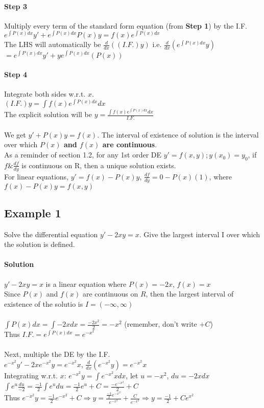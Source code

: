 \documentclass{article}
\begin{document}
\paragraph{Step 3} Multiply every term of the standard form equation (from \textbf{Step 1}) by the I.F.
\large \\$e^{\int\!P(x)dx}y'+e^{\int\!P(x)dx}P(x)y=f(x)e^{\int\!P(x)dx}$
\normalsize
\\The LHS will automatically be $\frac{d}{dx}((I.F.)y)$ i.e. $\frac{d}{dx}\left(e^{\int\!P(x)dx}y\right)$
\\$=e^{\int\!P(x)dx}y'+ye^{\int\!P(x)dx}(P(x))$

\paragraph{Step 4} Integrate both sides w.r.t. $x$.
\\$(I.F.)y=\int f(x)e^{\int P(x)dx}dx$
\\The explicit solution will be \Large $y=\frac{\int f(x)e^{\int P(x)dx}dx}{I.F.}$\normalsize
\\\\We get $y'+P(x)y=f(x)$. The interval of existence of solution is the interval over which \textbf{$P(x)$ and $f(x)$ are continuous}.
\\As a reminder of section 1.2, for any 1st order DE $y'=f(x,y);y(x_0)=y_0$, if $f\&\frac{df}{dy}$ is continuous on R, then a unique solution exists.
\\For linear equations, $y'=f(x)-P(x)y$, $\frac{df}{dy}=0-P(x)(1)$, where $f(x)-P(x)y=f(x,y)$

\subsection{Example 1}
Solve the differential equation $y'-2xy=x$. Give the largest interval I over which the solution is defined.

\paragraph{Solution} $y'-2xy=x$ is a linear equation where $P(x)=-2x$, $f(x)=x$
\\Since $P(x)$ and $f(x)$ are continuous on $R$, then the largest interval of existence of the solutio is $I=(-\infty,\infty)$
\\\\$\int P(x)dx=\int -2xdx=\frac{-2x^2}{2}=-x^2$ (remember, don't write $+C$)
\\Thus $I.F.=e^{\int\!P(x)dx}=e^{-x^2}$
\\\\Next, multiple the DE by the I.F.
\\$e^{-x^2}y'-2xe^{-x^2}y=e^{-x^2}x$, $\frac{d}{dx}\left(e^{-x^2}y\right)=e^{-x^2}x$
\\Integrating w.r.t. $x$: $e^{-x^2}y=\int e^{-x^2}xdx$, let $u=-x^2$, $du=-2xdx$
\\$\int e^u\frac{du}{-2}=\frac{-1}{2}\int e^udu=\frac{-1}{2}e^u+C=\frac{-e^{-x^2}}{2}+C$
\\Thus $e^{-x^2}y=\frac{-1}{2}e^{-x^2}+C\Rightarrow y=\frac{\frac{-1}{2}e^{-x^2}}{e^{-x^2}}+\frac{C}{e^{-x^2}}\Rightarrow y=\frac{-1}{2}+Ce^{x^2}$
\newpage
\end{document}
